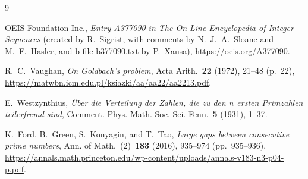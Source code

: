 \documentclass[11pt,a4paper]{article}
\theoremstyle{entheorem}
\theoremstyle{enremark}
\begin{document}
\begin{thebibliography}{9}
\small\raggedright
\setlength{\itemsep}{3pt}
OEIS Foundation Inc., \textit{Entry A377090 in The On-Line Encyclopedia of Integer Sequences} (created by R.~Sigrist, with comments by N.~J.~A.~Sloane and M.~F.~Hasler, and b-file \href{https://oeis.org/A377090/b377090.txt}{b377090.txt} by P.~Xausa), \url{https://oeis.org/A377090}.

R.~C.~Vaughan, \textit{On Goldbach's problem}, Acta Arith.~\textbf{22} (1972), 21--48 (p.~22), \url{https://matwbn.icm.edu.pl/ksiazki/aa/aa22/aa2213.pdf}.

E.~Westzynthius, \textit{\"Uber die Verteilung der Zahlen, die zu den $n$ ersten Primzahlen teilerfremd sind}, Comment. Phys.-Math. Soc. Sci. Fenn.~\textbf{5} (1931), 1--37.

K.~Ford, B.~Green, S.~Konyagin, and T.~Tao, \textit{Large gaps between consecutive prime numbers}, Ann. of Math.~(2)~\textbf{183} (2016), 935--974 (pp.~935--936), \url{https://annals.math.princeton.edu/wp-content/uploads/annals-v183-n3-p04-p.pdf}.
\end{thebibliography}
\end{document}
